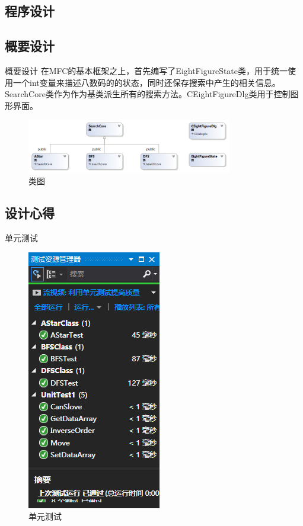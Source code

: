 \documentclass{beamer}
\begin{document}
\begin{frame}
\section{程序设计}
\subsection{概要设计}
\begin{block}{概要设计}
在MFC的基本框架之上，首先编写了EightFigureState类，用于统一使用一个int变量来描述八数码的的状态，同时还保存搜索中产生的相关信息。SearchCore类作为作为基类派生所有的搜索方法。CEightFigureDlg类用于控制图形界面。
\begin{figure}[H]
\centering
\includegraphics[width=0.8\textwidth]{3.png}
\caption{类图} 
\end{figure}
\end{block}
\end{frame}

\begin{frame}
\section{设计心得}
\begin{block}{单元测试}
\begin{figure}[H]
\centering
\includegraphics[scale = 0.5]{2.png}
\caption{单元测试} 
\end{figure}
\end{block}
\end{frame}
\end{document}
